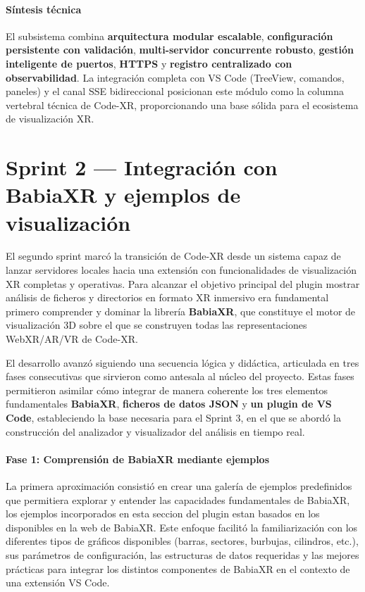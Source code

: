 \documentclass[a4paper, 12pt]{book}
\begin{document}
\paragraph{Síntesis técnica}
El subsistema combina \textbf{arquitectura modular escalable}, \textbf{configuración persistente con validación}, \textbf{multi-servidor concurrente robusto}, \textbf{gestión inteligente de puertos}, \textbf{HTTPS} y \textbf{registro centralizado con observabilidad}. La integración completa con VS Code (TreeView, comandos, paneles) y el canal SSE bidireccional posicionan este módulo como la columna vertebral técnica de Code-XR, proporcionando una base sólida para el ecosistema de visualización XR.


\section{Sprint 2 — Integración con BabiaXR y ejemplos de visualización}
\label{sec:sprint-babiaxr}

El segundo sprint marcó la transición de Code-XR desde un sistema capaz de lanzar servidores locales hacia una extensión con funcionalidades de visualización XR completas y operativas. Para alcanzar el objetivo principal del plugin mostrar análisis de ficheros y directorios en formato XR inmersivo era fundamental primero comprender y dominar la librería \textbf{BabiaXR}, que constituye el motor de visualización 3D sobre el que se construyen todas las representaciones WebXR/AR/VR de Code-XR.

El desarrollo avanzó siguiendo una secuencia lógica y didáctica, articulada en tres fases consecutivas que sirvieron como antesala al núcleo del proyecto. Estas fases permitieron asimilar cómo integrar de manera coherente los tres elementos fundamentales \textbf{BabiaXR}, \textbf{ficheros de datos JSON} y \textbf{un plugin de VS Code}, estableciendo la base necesaria para el Sprint 3, en el que se abordó la construcción del analizador y visualizador del análisis en tiempo real.

\paragraph{Fase 1: Comprensión de BabiaXR mediante ejemplos}
La primera aproximación consistió en crear una galería de ejemplos predefinidos que permitiera explorar y entender las capacidades fundamentales de BabiaXR, los ejemplos incorporados en esta seccion del plugin estan basados en los disponibles en la web de BabiaXR\cite{babiaxr-examples}. Este enfoque facilitó la familiarización con los diferentes tipos de gráficos disponibles (barras, sectores, burbujas, cilindros, etc.), sus parámetros de configuración, las estructuras de datos requeridas y las mejores prácticas para integrar los distintos componentes de BabiaXR en el contexto de una extensión VS Code.
\end{document}
